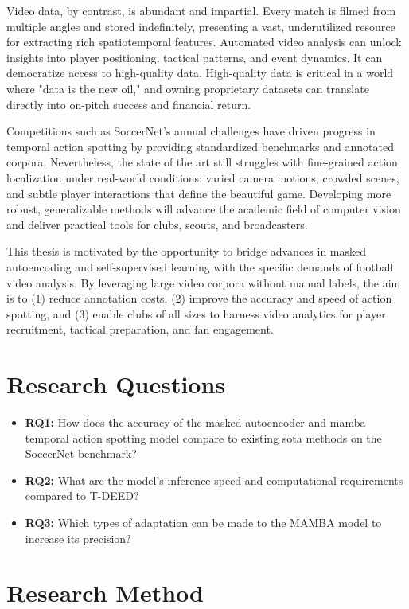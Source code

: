 Video data, by contrast, is abundant and impartial. Every match is filmed from multiple angles and stored indefinitely, presenting a vast, underutilized resource for extracting rich spatiotemporal features. Automated video analysis can unlock insights into player positioning, tactical patterns, and event dynamics. It can democratize access to high-quality data. High-quality data is critical in a world where "data is the new oil," and owning proprietary datasets can translate directly into on-pitch success and financial return.  

Competitions such as SoccerNet's annual challenges have driven progress in temporal action spotting by providing standardized benchmarks and annotated corpora. Nevertheless, the state of the art still struggles with fine-grained action localization under real-world conditions: varied camera motions, crowded scenes, and subtle player interactions that define the beautiful game. Developing more robust, generalizable methods will advance the academic field of computer vision and deliver practical tools for clubs, scouts, and broadcasters.  

This thesis is motivated by the opportunity to bridge advances in masked autoencoding and self-supervised learning with the specific demands of football video analysis. By leveraging large video corpora without manual labels, the aim is to (1) reduce annotation costs, (2) improve the accuracy and speed of action spotting, and (3) enable clubs of all sizes to harness video analytics for player recruitment, tactical preparation, and fan engagement.  

\section{Research Questions}
\label{sec:research_questions}
\begin{itemize}
    \item \textbf{RQ1:} How does the accuracy of the masked-autoencoder and mamba temporal action spotting model compare to existing \acrlong{sota} methods on the SoccerNet benchmark?
    \item \textbf{RQ2:} What are the model's inference speed and computational requirements compared to T-DEED?
    \item \textbf{RQ3:} Which types of adaptation can be made to the MAMBA model to increase its precision?
\end{itemize}

\section{Research Method}

